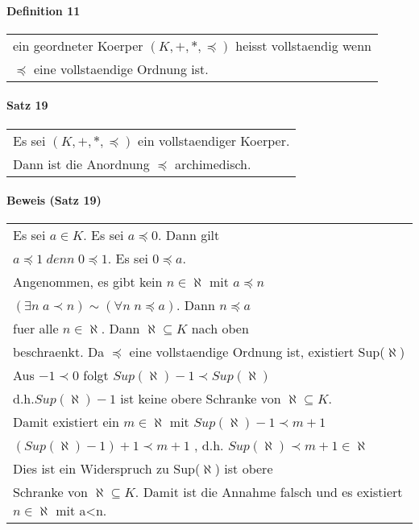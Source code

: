 \documentclass{scrartcl}
\begin{document}
\paragraph{Definition 11}
\begin{tabbing}
\begin{tabular}{l}
ein geordneter Koerper $(K,+,*,\preceq )$ heisst vollstaendig wenn\\
$\preceq$ eine vollstaendige Ordnung ist.
\end{tabular}
\end{tabbing}

\paragraph{Satz 19}
\begin{tabbing}
\begin{tabular}{l}
Es sei $(K,+,*,\preceq)$ ein vollstaendiger Koerper.\\
Dann ist die Anordnung $\preceq$ archimedisch.
\end{tabular}
\end{tabbing}

\paragraph{Beweis (Satz 19)}
\begin{tabbing}
\begin{tabular}{l}
Es sei $a \in K$. Es sei $a \preceq 0$. Dann gilt \\
$a \preceq 1 \; denn\; 0 \preceq 1$. Es sei $0 \preceq a$.\\
Angenommen, es gibt kein $n \in \aleph $ mit $a \preceq n$ \\
$ (\exists n\;a \prec n) \sim (\forall n\;n\preceq a)$. Dann $n\preceq a$ \\
fuer alle $n\in \aleph $. Dann $ \aleph \subseteq K $ nach oben\\
beschraenkt. Da $\preceq$ eine vollstaendige Ordnung ist, existiert 
Sup($ \aleph $)\\
Aus $ -1 \prec 0 $ folgt $Sup(\aleph) -1 \prec Sup(\aleph)$ \\
d.h.$Sup(\aleph)-1$ ist keine obere Schranke von $\aleph \subseteq K$. \\
Damit existiert ein $m\in \aleph$ mit $Sup(\aleph)-1 \prec m+1$ \\
$(Sup(\aleph)-1 )+1\prec m+1$ , d.h. $Sup(\aleph)\prec m+1 \in \aleph$\\
Dies ist ein Widerspruch zu Sup($\aleph$) ist obere\\
Schranke von $\aleph \subseteq K$. Damit ist die Annahme falsch und es existiert $n\in \aleph$ mit a<n.
\end{tabular}
\end{tabbing}
\end{document}
